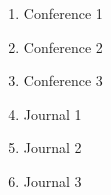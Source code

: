 \listofpapers
	
\begin{enumerate} 
\item Conference 1
\item Conference 2
\item Conference 3
\item Journal 1
\item Journal 2
\item Journal 3
\end{enumerate} 
